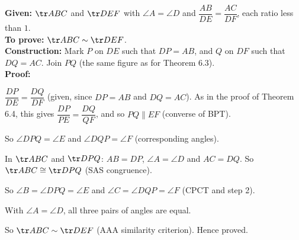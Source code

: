 \textbf{Given:} $\tr ABC$ and $\tr DEF$ with $\angle A=\angle D$ and $\dfrac{AB}{DE}=\dfrac{AC}{DF}$, each ratio less than $1$.\\
\textbf{To prove:} $\tr ABC\sim\tr DEF$.\\
\textbf{Construction:} Mark $P$ on $DE$ such that $DP=AB$, and $Q$ on $DF$ such that $DQ=AC$. Join $PQ$ (the same figure as for Theorem 6.3).\\
\textbf{Proof:}
\begin{steps}
  \item $\dfrac{DP}{DE}=\dfrac{DQ}{DF}$ (given, since $DP=AB$ and $DQ=AC$). As in the proof of Theorem 6.4, this gives $\dfrac{DP}{PE}=\dfrac{DQ}{QF}$, and so $PQ\parallel EF$ (converse of BPT).
  \item So $\angle DPQ=\angle E$ and $\angle DQP=\angle F$ (corresponding angles).
  \item In $\tr ABC$ and $\tr DPQ$: $AB=DP$, $\angle A=\angle D$ and $AC=DQ$. So $\tr ABC\cong\tr DPQ$ (SAS congruence).
  \item So $\angle B=\angle DPQ=\angle E$ and $\angle C=\angle DQP=\angle F$ (CPCT and step 2).
  \item With $\angle A=\angle D$, all three pairs of angles are equal.
\end{steps}
So $\tr ABC\sim\tr DEF$ (AAA similarity criterion). \hfill Hence proved.


